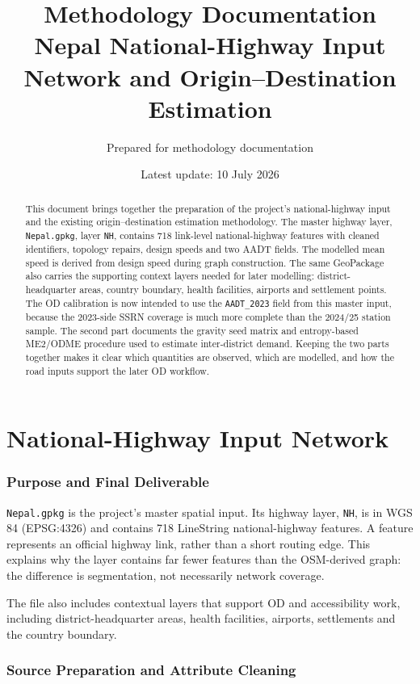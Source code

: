 \documentclass[11pt,a4paper]{article}
\title{\textbf{Methodology Documentation}\\
\large Nepal National-Highway Input Network and Origin--Destination Estimation}
\author{Prepared for methodology documentation}
\date{Latest update: 10 July 2026}
\begin{document}
\maketitle

\begin{abstract}
This document brings together the preparation of the project's national-highway
input and the existing origin--destination estimation methodology. The master
highway layer, \texttt{Nepal.gpkg}, layer \texttt{NH}, contains 718 link-level national-highway
features with cleaned identifiers, topology repairs, design speeds and two
AADT fields. The modelled mean speed is derived from design speed during graph
construction. The same GeoPackage also carries the
supporting context layers needed for later modelling: district-headquarter
areas, country boundary, health facilities, airports and settlement points. The OD calibration is
now intended to use the \texttt{AADT\_2023} field from this master input, because
the 2023-side SSRN coverage is much more complete than the 2024/25 station
sample. The second part documents the gravity seed matrix and entropy-based
ME2/ODME procedure used to estimate inter-district demand. Keeping the two
parts together makes it clear which quantities are observed, which are
modelled, and how the road inputs support the later OD workflow.
\end{abstract}

\part{National-Highway Input Network}

\section{Purpose and Final Deliverable}

\texttt{Nepal.gpkg} is the project's master spatial input. Its highway layer,
\texttt{NH}, is in WGS 84 (EPSG:4326) and contains 718 LineString
national-highway features. A feature represents an official highway link,
rather than a short routing edge. This explains why the layer contains far
fewer features than the OSM-derived graph: the difference is segmentation, not
necessarily network coverage.

The file also includes contextual layers that support OD and accessibility
work, including district-headquarter areas, health facilities, airports,
settlements and the country boundary.

\section{Source Preparation and Attribute Cleaning}
\end{document}
